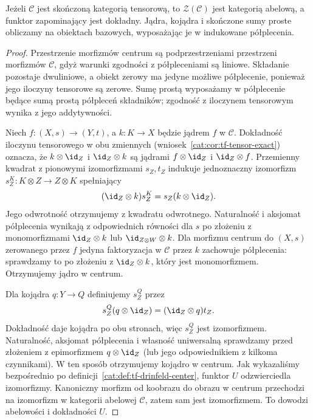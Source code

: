\begin{stwierdzenie}\label{cat:prop:tf-center-abelian}
Jeżeli $\mathcal C$ jest skończoną kategorią tensorową, to $\mathcal Z(\mathcal C)$ jest kategorią abelową, a funktor zapominający jest dokładny. Jądra, kojądra i skończone sumy proste obliczamy na obiektach bazowych, wyposażając je w indukowane półplecenia.
\end{stwierdzenie}
\begin{proof}
Przestrzenie morfizmów centrum są podprzestrzeniami przestrzeni morfizmów $\mathcal C$, gdyż warunki zgodności z półpleceniami są liniowe. Składanie pozostaje dwuliniowe, a obiekt zerowy ma jedyne możliwe półplecenie, ponieważ jego iloczyny tensorowe są zerowe. Sumę prostą wyposażamy w półplecenie będące sumą prostą półpleceń składników; zgodność z iloczynem tensorowym wynika z jego addytywności.

Niech $f:(X,s)\to(Y,t)$, a $k:K\to X$ będzie jądrem $f$ w $\mathcal C$. Dokładność iloczynu tensorowego w obu zmiennych (wniosek~\ref{cat:cor:tf-tensor-exact}) oznacza, że $k\otimes\id_Z$ i $\id_Z\otimes k$ są jądrami $f\otimes\id_Z$ i $\id_Z\otimes f$. Przemienny kwadrat z pionowymi izomorfizmami $s_Z,t_Z$ indukuje jednoznaczny izomorfizm $s^K_Z:K\otimes Z\to Z\otimes K$ spełniający
\[
 (\id_Z\otimes k)s^K_Z=s_Z(k\otimes\id_Z).
\]
Jego odwrotność otrzymujemy z kwadratu odwrotnego. Naturalność i aksjomat półplecenia wynikają z odpowiednich równości dla $s$ po złożeniu z monomorfizmami $\id_Z\otimes k$ lub $\id_{Z\otimes W}\otimes k$. Dla morfizmu centrum do $(X,s)$ zerowanego przez $f$ jedyna faktoryzacja w $\mathcal C$ przez $k$ zachowuje półplecenia: sprawdzamy to po złożeniu z $\id_Z\otimes k$, który jest monomorfizmem. Otrzymujemy jądro w centrum.

Dla kojądra $q:Y\to Q$ definiujemy $s^Q_Z$ przez
\[
 s^Q_Z(q\otimes\id_Z)=(\id_Z\otimes q)t_Z.
\]
Dokładność daje kojądra po obu stronach, więc $s^Q_Z$ jest izomorfizmem. Naturalność, aksjomat półplecenia i własność uniwersalną sprawdzamy przed złożeniem z epimorfizmem $q\otimes\id_Z$ (lub jego odpowiednikiem z kilkoma czynnikami). W ten sposób otrzymujemy kojądro w centrum. Jak wykazaliśmy bezpośrednio po definicji~\ref{cat:def:tf-drinfeld-center}, funktor $U$ odzwierciedla izomorfizmy. Kanoniczny morfizm od koobrazu do obrazu w centrum przechodzi na izomorfizm w kategorii abelowej $\mathcal C$, zatem sam jest izomorfizmem. To dowodzi abelowości i dokładności $U$.
\end{proof}


